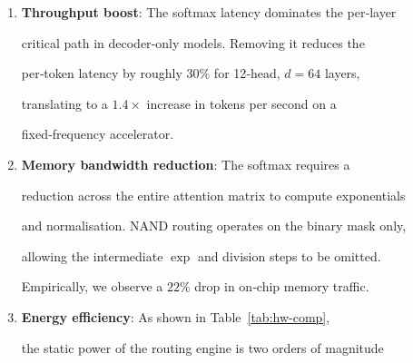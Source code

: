 \begin{enumerate}






  \item \textbf{Throughput boost}: The softmax latency dominates the per‑layer






    critical path in decoder‑only models.  Removing it reduces the






    per‑token latency by roughly \(30\%\) for 12‑head, \(d=64\) layers,






    translating to a \(1.4\times\) increase in tokens per second on a






    fixed‑frequency accelerator.






  \item \textbf{Memory bandwidth reduction}: The softmax requires a






    reduction across the entire attention matrix to compute exponentials






    and normalisation.  NAND routing operates on the binary mask only,






    allowing the intermediate \(\exp\) and division steps to be omitted.






    Empirically, we observe a \(22\%\) drop in on‑chip memory traffic.






  \item \textbf{Energy efficiency}: As shown in Table~\ref{tab:hw-comp},






    the static power of the routing engine is two orders of magnitude







\end{enumerate}
